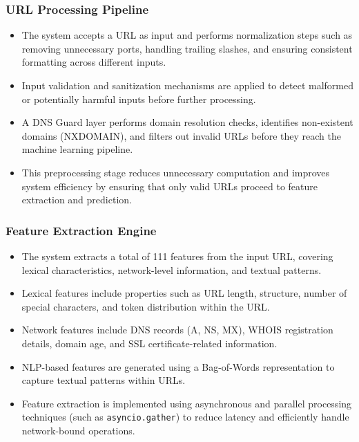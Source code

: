 \subsubsection*{URL Processing Pipeline}

\begin{itemize}
    \item The system accepts a URL as input and performs normalization steps such as removing unnecessary ports, handling trailing slashes, and ensuring consistent formatting across different inputs.
    
    \item Input validation and sanitization mechanisms are applied to detect malformed or potentially harmful inputs before further processing.
    
    \item A DNS Guard layer performs domain resolution checks, identifies non-existent domains (NXDOMAIN), and filters out invalid URLs before they reach the machine learning pipeline.
    
    \item This preprocessing stage reduces unnecessary computation and improves system efficiency by ensuring that only valid URLs proceed to feature extraction and prediction.
\end{itemize}

\subsubsection*{Feature Extraction Engine}

\begin{itemize}
    \item The system extracts a total of 111 features from the input URL, covering lexical characteristics, network-level information, and textual patterns.
    
    \item Lexical features include properties such as URL length, structure, number of special characters, and token distribution within the URL.
    
    \item Network features include DNS records (A, NS, MX), WHOIS registration details, domain age, and SSL certificate-related information.
    
    \item NLP-based features are generated using a Bag-of-Words representation to capture textual patterns within URLs.
    
    \item Feature extraction is implemented using asynchronous and parallel processing techniques (such as \texttt{asyncio.gather}) to reduce latency and efficiently handle network-bound operations.
\end{itemize}

